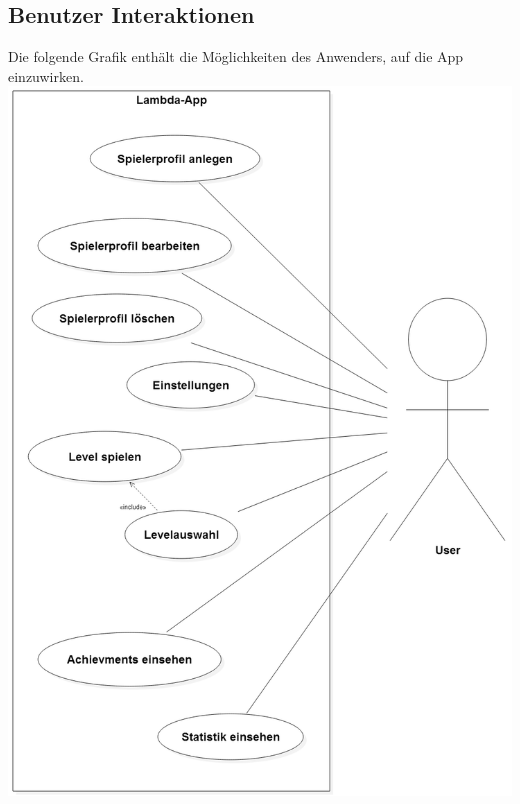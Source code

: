 \documentclass{scrartcl}
\begin{document}
\begin{minipage}{1\textwidth}
\subsection{Benutzer Interaktionen}
Die folgende Grafik enthält die Möglichkeiten des Anwenders, auf die App einzuwirken.\\
\includegraphics[width=\textwidth]{assets/Benutzerdiagramm}
\end{minipage}

\clearpage






{}
\printglossary[title=Glossar]
\thispagestyle{empty}
    
\end{document}
